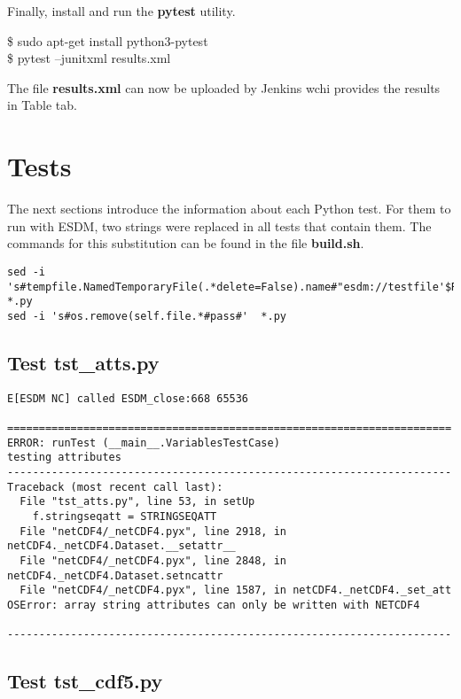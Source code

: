 Finally, install and run the \textbf{pytest} utility.

\begin{framed}
\$ sudo apt-get install python3-pytest \\
\$ pytest --junitxml results.xml
\end{framed}

The file \textbf{results.xml} can now be uploaded by Jenkins wchi provides the results in Table tab.

\section{Tests}

\tab
The next sections introduce the information about each Python test. For them to run with ESDM, two strings were replaced in all tests that contain them. The commands for this substitution can be found in the file \textbf{build.sh}.

\begin{verbatim}
sed -i 's#tempfile.NamedTemporaryFile(.*delete=False).name#"esdm://testfile'$RANDOM'"#'  *.py
sed -i 's#os.remove(self.file.*#pass#'  *.py
\end{verbatim}

\subsection{Test tst\_atts.py}

\begin{verbatim}
E[ESDM NC] called ESDM_close:668 65536

======================================================================
ERROR: runTest (__main__.VariablesTestCase)
testing attributes
----------------------------------------------------------------------
Traceback (most recent call last):
  File "tst_atts.py", line 53, in setUp
    f.stringseqatt = STRINGSEQATT
  File "netCDF4/_netCDF4.pyx", line 2918, in netCDF4._netCDF4.Dataset.__setattr__
  File "netCDF4/_netCDF4.pyx", line 2848, in netCDF4._netCDF4.Dataset.setncattr
  File "netCDF4/_netCDF4.pyx", line 1587, in netCDF4._netCDF4._set_att
OSError: array string attributes can only be written with NETCDF4

----------------------------------------------------------------------
\end{verbatim}

\subsection{Test tst\_cdf5.py}

